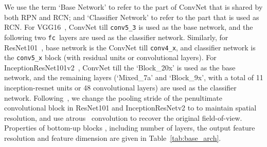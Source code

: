 \documentclass[10pt,twocolumn,letterpaper]{article}
\newcommand{\vv}[1]{{\texttt{#1}}}
\newcommand{\conv}{\vv{conv}}
\newcommand{\fc}{\vv{fc}}
\begin{document}
We use the term `Base Network' to refer to the part of ConvNet that is shared by both RPN and RCN; and `Classifier Network' to refer to the part that is used as RCN. For VGG16~\cite{VGG,ren2015faster}, ConvNet till \conv\verb|5_3| is used as the base network, and the following two \fc\ layers are used as the classifier network. Similarly, for ResNet101~\cite{resnet,ren2015faster}, base network is the ConvNet till \conv\verb|4_x|, and classifier network is the \conv\verb|5_x| block (with  residual units or  convolutional layers). For InceptionResNet101v2~\cite{szegedy2016inception,huang2016speed}, ConvNet till the `Block\_20x' is used as the base network, and the remaining layers (`Mixed\_7a' and `Block\_9x', with a total of 11 inception-resnet units or 48 convolutional layers) are used as the classifier network. Following~\cite{huang2016speed}, we change the pooling stride of the penultimate convolutional block in ResNet101 and InceptionResNetv2 to  to maintain spatial resolution, and use atrous~\cite{deeplab,liu2015parsenet} convolution to recover the original field-of-view. Properties of bottom-up blocks , including number of layers, the output feature resolution and feature dimension \etc are given in Table~\ref{tab:base_arch}.
\end{document}
